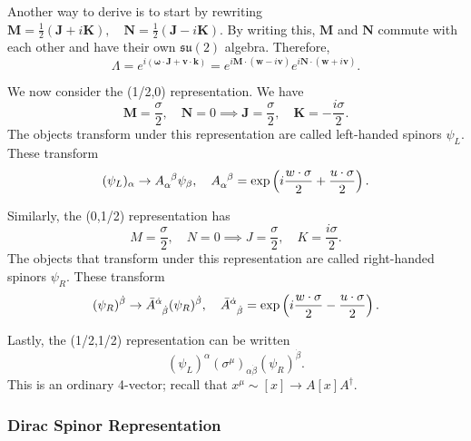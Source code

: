 \documentclass{article}
\begin{document}
Another way to derive is to start by rewriting $\mathbf M=\frac 12(\mathbf J+i\mathbf K),\quad\mathbf N=\frac 12(\mathbf J-i\mathbf K)$. By writing this, $\mathbf M$ and $\mathbf N$ commute with each other and have their own $\mathfrak{su}(2)$ algebra. Therefore, 
$$\Lambda=e^{i(\mathbf\omega\cdot\mathbf J+\mathbf v\cdot\mathbf k)}=e^{i\mathbf M\cdot(\mathbf w-i\mathbf v)}e^{i\mathbf N\cdot(\mathbf w+i\mathbf v)}.$$

We now consider the (1/2,0) representation. We have 
$$\mathbf M=\frac{\sigma}2,\quad\mathbf N=0\implies\mathbf J=\frac{\sigma}2,\quad\mathbf K=-\frac{i\sigma}2.$$
The objects transform under this representation are called left-handed spinors $\psi_L$. These transform
$$(\psi_L)_\alpha\to A\indices{_\alpha^\beta}\psi_\beta,\quad A\indices{_\alpha^\beta}=\exp\left(i\frac{w\cdot\sigma}{2}+\frac{u\cdot\sigma}2\right).$$

Similarly, the (0,1/2) representation has
$$M=\frac{\sigma}2,\quad N=0\implies J=\frac{\sigma}2,\quad K=\frac{i\sigma}2.$$
The objects that transform under this representation are called right-handed spinors $\psi_R$. These transform
$$(\psi_R)^{\dot\beta}\to\bar A\indices{^{\dot\alpha}_{\dot\beta}}(\psi_R)^{\dot\beta},\quad\bar A\indices{^{\dot\alpha}_{\dot\beta}}=\exp\left(i\frac{w\cdot\sigma}2-\frac{u\cdot\sigma}2\right).$$

Lastly, the (1/2,1/2) representation can be written 
$$(\psi_L)^\alpha(\sigma^\mu)_{\alpha\dot\beta}(\psi_R)^{\dot\beta}.$$
This is an ordinary 4-vector; recall that $x^\mu\sim [x]\to A[x]A^\dag$.

\subsubsection{Dirac Spinor Representation}
\end{document}
